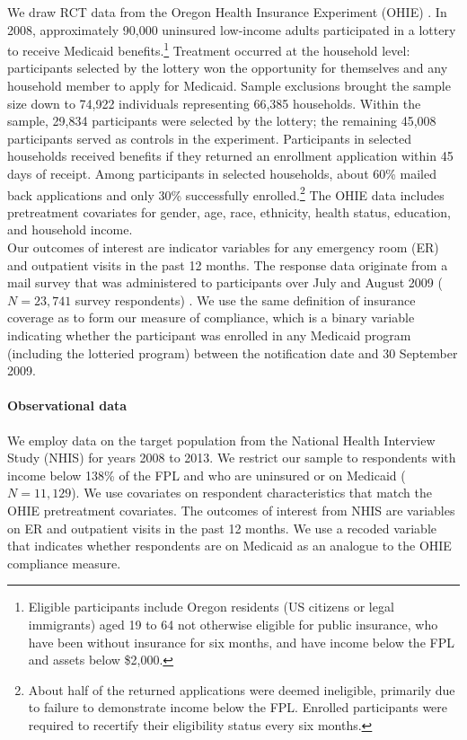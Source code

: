 \documentclass[12pt]{article}
\begin{document}
We draw RCT data from the Oregon Health Insurance Experiment (OHIE) \citep{finkelstein2012,baicker2013,baicker2014,Taubman}.  In 2008, approximately 90,000 uninsured low-income adults participated in a lottery to receive Medicaid benefits.\footnote{Eligible participants include Oregon residents (US citizens or legal immigrants) aged 19 to 64 not otherwise eligible for public insurance, who have been without insurance for six months, and have income below the FPL and assets below \$2,000.} Treatment occurred at the household level: participants selected by the lottery won the opportunity for themselves and any household member to apply for Medicaid. Sample exclusions brought the sample size down to 74,922 individuals representing 66,385 households.  Within the sample, 29,834 participants were selected by the lottery; the remaining 45,008 participants served as controls in the experiment.  Participants in selected households received benefits if they returned an enrollment application within 45 days of receipt. Among participants in selected households, about 60\% mailed back applications and only 30\% successfully enrolled.\footnote{About half of the returned applications were deemed ineligible, primarily due to failure to demonstrate income below the FPL. Enrolled participants were required to recertify their eligibility status every six months.} The OHIE data includes pretreatment covariates for gender, age, race, ethnicity, health status, education, and household income. \\

Our outcomes of interest are indicator variables for any emergency room (ER) and outpatient visits in the past 12 months. The response data originate from a mail survey that was administered to participants over July and August 2009 ($N = 23,741$ survey respondents) \cite{finkelstein2012}. We use the same definition of insurance coverage as \citet{finkelstein2012} to form our measure of compliance, which is a binary variable indicating whether the participant was enrolled in any Medicaid program (including the lotteried program) between the notification date and 30 September 2009. 

\paragraph{Observational data} 

We employ data on the target population from the National Health Interview Study (NHIS) \cite{NHIS} for years 2008 to 2013.  We restrict our sample to respondents with income below 138\% of the FPL and who are uninsured or on Medicaid ($N=11,129$). We use covariates on respondent characteristics that match the OHIE pretreatment covariates. The outcomes of interest from NHIS are variables on ER and outpatient visits in the past 12 months. We use a recoded variable that indicates whether respondents are on Medicaid as an analogue to the OHIE compliance measure.
\end{document}
